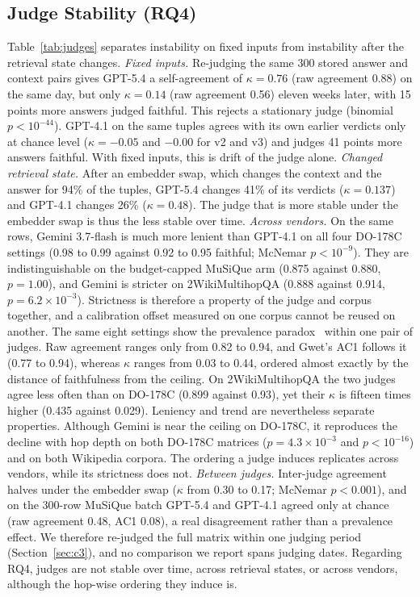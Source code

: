 \subsection{Judge Stability (RQ4)}
\label{sec:c4}
Table~\ref{tab:judges} separates instability on fixed inputs from
instability after the retrieval state changes.
\textit{Fixed inputs.} Re-judging the same 300 stored answer and
context pairs gives GPT-5.4 a self-agreement of $\kappa = 0.76$ (raw
agreement 0.88) on the same day, but only $\kappa = 0.14$ (raw agreement
0.56) eleven weeks later, with 15 points more answers judged faithful.
This rejects a stationary judge (binomial $p < 10^{-44}$). GPT-4.1 on the same tuples agrees with its own earlier
verdicts only at chance level ($\kappa = -0.05$ and $-0.00$ for v2 and
v3) and judges 41 points more answers faithful. With fixed inputs, this is drift of the judge alone.
\textit{Changed retrieval state.} After an embedder swap, which
changes the context and the answer for 94\% of the tuples, GPT-5.4
changes 41\% of its verdicts ($\kappa = 0.137$) and GPT-4.1 changes 26\%
($\kappa = 0.48$). The judge that is more stable under the embedder
swap is thus the less stable over time.
\textit{Across vendors.} On the same rows, Gemini 3.7-flash is much
more lenient than GPT-4.1 on all four DO-178C settings (0.98 to 0.99
against 0.92 to 0.95 faithful; McNemar $p < 10^{-9}$). They are indistinguishable on the budget-capped MuSiQue arm (0.875 against 0.880,
$p = 1.00$), and Gemini is stricter on 2WikiMultihopQA (0.888 against
0.914, $p = 6.2 \times 10^{-3}$). Strictness is therefore a property of
the judge and corpus together, and a calibration offset measured on one
corpus cannot be reused on another. The same eight
settings show the prevalence paradox~\cite{feinstein1990} within one
pair of judges. Raw agreement ranges only from 0.82 to 0.94, and Gwet's
AC1 follows it (0.77 to 0.94), whereas $\kappa$ ranges from 0.03 to
0.44, ordered almost exactly by the distance of faithfulness from the
ceiling. On 2WikiMultihopQA the two judges agree less often than on
DO-178C (0.899 against 0.93), yet their $\kappa$ is fifteen times
higher (0.435 against 0.029). Leniency and trend are nevertheless
separate properties. Although Gemini is near the ceiling on DO-178C, it
reproduces the decline with hop depth on both DO-178C matrices
($p = 4.3 \times 10^{-3}$ and $p < 10^{-16}$) and on both Wikipedia
corpora. The ordering a judge induces replicates across vendors, while
its strictness does not.
\textit{Between judges.} Inter-judge agreement halves under the embedder swap ($\kappa$ from
0.30 to 0.17; McNemar $p < 0.001$), and on the 300-row MuSiQue batch
GPT-5.4 and GPT-4.1 agreed only at chance (raw agreement 0.48, AC1
0.08), a real disagreement rather than a prevalence effect. We therefore
re-judged the full matrix within one judging period
(Section~\ref{sec:c3}), and no comparison we report spans judging
dates. Regarding RQ4, judges are not stable over
time, across retrieval states, or across vendors, although the hop-wise
ordering they induce is.
